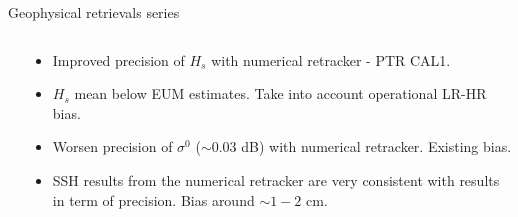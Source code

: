 \documentclass[compress,8pt]{beamer}
\begin{document}
\begin{frame}{Geophysical retrievals series}
\begin{columns}
\begin{column}{0.5\textwidth}
\end{column}
\begin{column}{0.5\textwidth}\centering

\begin{itemize}
 \item Improved precision of $H_s$ with numerical retracker - PTR CAL1.
 \item $H_s$ mean below EUM estimates. Take into account operational LR-HR bias.
 \item Worsen precision of $\sigma^0$ ($\sim 0.03$ dB) with numerical retracker. Existing bias.
 \item SSH results from the numerical retracker are very consistent with results in term of precision. Bias around $\sim 1-2$ cm.
\end{itemize}


  
\end{column}
\end{columns}

\end{frame}



\end{document}

